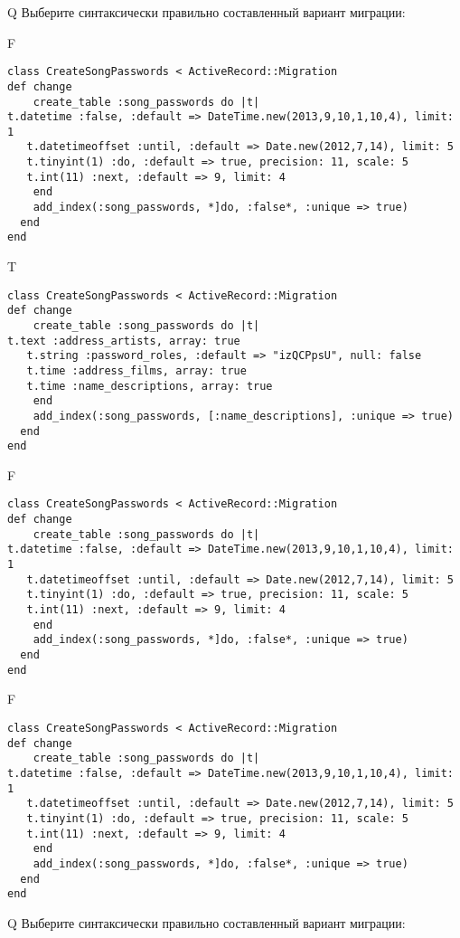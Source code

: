 Q
Выберите синтаксически правильно составленный вариант миграции:

F
\begin{verbatim}
class CreateSongPasswords < ActiveRecord::Migration
def change
	create_table :song_passwords do |t|
t.datetime :false, :default => DateTime.new(2013,9,10,1,10,4), limit: 1
   t.datetimeoffset :until, :default => Date.new(2012,7,14), limit: 5
   t.tinyint(1) :do, :default => true, precision: 11, scale: 5
   t.int(11) :next, :default => 9, limit: 4
   	end
	add_index(:song_passwords, *]do, :false*, :unique => true)
  end 
end

\end{verbatim}

T
\begin{verbatim}
class CreateSongPasswords < ActiveRecord::Migration
def change
	create_table :song_passwords do |t|
t.text :address_artists, array: true
   t.string :password_roles, :default => "izQCPpsU", null: false
   t.time :address_films, array: true
   t.time :name_descriptions, array: true
   	end
	add_index(:song_passwords, [:name_descriptions], :unique => true)
  end 
end

\end{verbatim}

F
\begin{verbatim}
class CreateSongPasswords < ActiveRecord::Migration
def change
	create_table :song_passwords do |t|
t.datetime :false, :default => DateTime.new(2013,9,10,1,10,4), limit: 1
   t.datetimeoffset :until, :default => Date.new(2012,7,14), limit: 5
   t.tinyint(1) :do, :default => true, precision: 11, scale: 5
   t.int(11) :next, :default => 9, limit: 4
   	end
	add_index(:song_passwords, *]do, :false*, :unique => true)
  end 
end

\end{verbatim}

F
\begin{verbatim}
class CreateSongPasswords < ActiveRecord::Migration
def change
	create_table :song_passwords do |t|
t.datetime :false, :default => DateTime.new(2013,9,10,1,10,4), limit: 1
   t.datetimeoffset :until, :default => Date.new(2012,7,14), limit: 5
   t.tinyint(1) :do, :default => true, precision: 11, scale: 5
   t.int(11) :next, :default => 9, limit: 4
   	end
	add_index(:song_passwords, *]do, :false*, :unique => true)
  end 
end

\end{verbatim}

Q
Выберите синтаксически правильно составленный вариант миграции:

